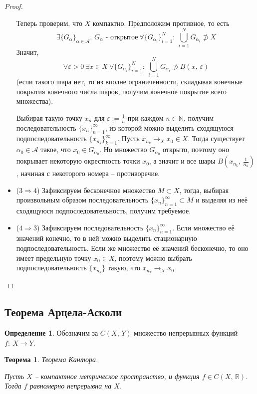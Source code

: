 \documentclass[a4paper,12pt]{article}
\theoremstyle{plain}
\newtheorem{theorem}{Теорема}[section]
\theoremstyle{definition}
\newtheorem{definition}{Определение}[section]
\theoremstyle{remark}
\begin{document}
\begin{proof}
\begin{itemize}
		      Теперь проверим, что $X$ компактно. Предположим противное, то есть
		      \[
			      \exists \{G_\alpha\}_{\alpha \in \mathcal{A}},\, G_\alpha \text{ - открытое} \: \forall \{G_{\alpha_i}\}_{i = 1}^N :\: \bigcup_{i = 1}^N  G_{\alpha_i} \not\supset X
		      \]
		      Значит,
		      \[
			      \forall \varepsilon > 0 \: \exists x \in X  \: \forall \{G_{\alpha_i}\}_{i = 1}^N :\: \bigcup_{i = 1}^N  G_{\alpha_i} \not\supset B (x,\, \varepsilon)
		      \]
		      (если такого шара нет, то из вполне ограниченности, складывая конечные покрытия конечного числа шаров, получим конечное покрытие всего множества).

		      Выбирая такую точку $x_n$ для $\varepsilon := \frac{1}{n}$ при каждом $n \in \mathbb{N}$, получим последовательность $\{x_n\}_{n = 1}^\infty$, из которой можно выделить сходящуюся подпоследовательность $\{x_{n_k}\}_{k = 1}^\infty$. Пусть $x_{n_k} \to_X x_0 \in X$.
		      Тогда существует $\alpha_0 \in \mathcal{A}$ такое, что $x_0 \in G_{\alpha_0}$. Но множество $G_{\alpha_0}$ открыто, поэтому оно покрывает некоторую окрестность точки $x_0$, а значит и все шары $B(x_{n_k},\, \frac{1}{n_k})$, начиная с некоторого номера -- противоречие.
		\item ($3 \Rightarrow 4$) Зафиксируем бесконечное множество $M \subset X$, тогда, выбирая произвольным образом последовательность $\{x_n\}_{n = 1}^\infty \subset M$ и выделяя из неё сходящуюся подпоследовательность, получим требуемое.
		\item ($4 \Rightarrow 3$) Зафиксируем последовательность $\{x_n\}_{n = 1}^\infty$. Если множество её значений конечно, то в ней можно выделить стационарную подпоследовательность. Если же множество её значений бесконечно, то оно имеет предельную точку $x_0 \in X$, поэтому можно выбрать подпоследовательность $\{x_{n_k}\}$ такую, что $x_{n_k} \to_X x_0$
	\end{itemize}
\end{proof}

\subsection{Теорема Арцела-Асколи}
\begin{definition}
	Обозначим за $C(X,\, Y)$ множество непрерывных функций $f:\: X \to Y$.
\end{definition}

\begin{theorem}
	Теорема Кантора.

	Пусть $X$ -- компактное метрическое пространство, и функция $f \in C(X,\, \mathbb{R})$. Тогда $f$ равномерно непрерывна на $X$.
\end{theorem}
\end{document}
